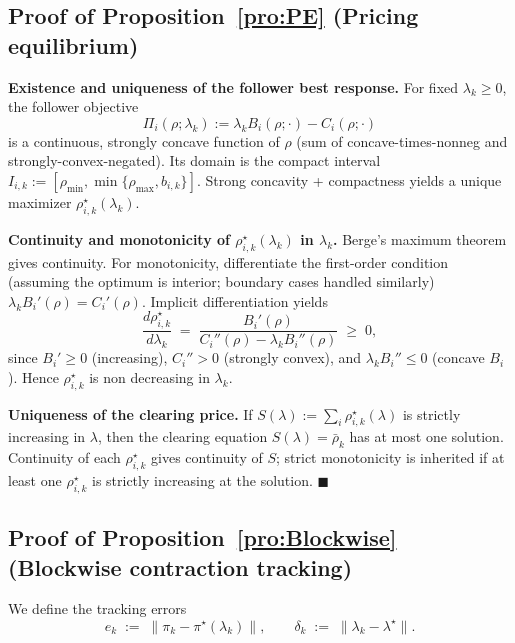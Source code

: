 \documentclass{article}
\begin{document}
\subsection{Proof of Proposition~\ref{pro:PE} (Pricing equilibrium)}\label{app:PE}

\textbf{Existence and uniqueness of the follower best response.} For fixed $\lambda_k \ge 0$, the follower objective
$$\Pi_i(\rho; \lambda_k) := \lambda_k B_i(\rho; \cdot) - C_i(\rho; \cdot)$$
is a continuous, strongly concave function of $\rho$ (sum of concave-times-nonneg and strongly-convex-negated). Its domain is the compact interval $I_{i,k} := [\rho_{\min}, \min\{\rho_{\max}, b_{i,k}\}]$. Strong concavity + compactness yields a unique maximizer $\rho_{i,k}^\star(\lambda_k)$.

\textbf{Continuity and monotonicity of $\rho_{i,k}^\star(\lambda_k)$ in $\lambda_k$.} Berge's maximum theorem gives continuity. For monotonicity, differentiate the first-order condition (assuming the optimum is interior; boundary cases handled similarly) $\lambda_k B_i'(\rho) = C_i'(\rho).$ Implicit differentiation yields
$$\frac{d\rho_{i,k}^\star}{d\lambda_k} \;=\; \frac{B_i'(\rho)}{C_i''(\rho) - \lambda_k B_i''(\rho)} \;\ge\; 0,$$
since $B_i' \ge 0$ (increasing), $C_i'' > 0$ (strongly convex), and $\lambda_k B_i'' \le 0$ (concave $B_i$). Hence $\rho_{i,k}^\star$ is non decreasing in $\lambda_k$.

\textbf{Uniqueness of the clearing price.} If $S(\lambda) := \sum_i \rho_{i,k}^\star(\lambda)$ is strictly increasing in $\lambda$, then the clearing equation $S(\lambda) = \bar\rho_k$ has at most one solution. Continuity of each $\rho_{i,k}^\star$ gives continuity of $S$; strict monotonicity is inherited if at least one $\rho_{i,k}^\star$ is strictly increasing at the solution. $\blacksquare$

\subsection{Proof of Proposition~\ref{pro:Blockwise} (Blockwise contraction tracking)}\label{app:Blockwise}

We define the tracking errors
$$e_k \;:=\; \|\pi_k - \pi^\star(\lambda_k)\|, \qquad \delta_k \;:=\; \|\lambda_k - \lambda^\star\|.$$
\end{document}
